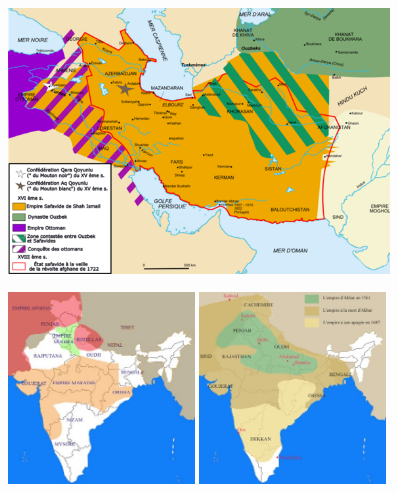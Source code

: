  
\begin{figure}[h!]
    \centering
 \includegraphics[width=0.9\textwidth]{CourantsIslamContemporain/ImagesCourantsIslamContemporain/empireSafavide.png}

    
\end{figure}


\begin{figure}[h!]
    \centering
 \includegraphics[width=0.44\textwidth]{CourantsIslamContemporain/ImagesCourantsIslamContemporain/Inde18.jpg}
  \includegraphics[width=0.44\textwidth]{CourantsIslamContemporain/ImagesCourantsIslamContemporain/empireMoghol.jpg}
\end{figure}

